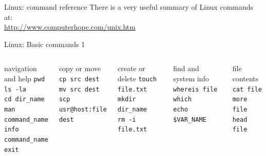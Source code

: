 \documentclass{beamer}
\begin{document}
\begin{frame}{Linux: command reference}
There is a very useful summary of Linux commands at: \\
\url{http://www.computerhope.com/unix.htm}
\end{frame}


\begin{frame}{Linux: Basic commands 1}
  \begin{columns}
    \begin{block}{navigation and help}
      \texttt{pwd} \\
      \texttt{ls -la} \\
      \texttt{cd dir\_name} \\
      \texttt{man command\_name} \\
      \texttt{info command\_name} \\
      \texttt{exit}
    \end{block}
    \begin{block}{copy or move}
      \texttt{cp src dest} \\
      \texttt{mv src dest} \\
      \texttt{scp usr@host:file dest}
    \end{block}

    \begin{block}{create or delete}
      \texttt{touch file.txt} \\ 
      \texttt{mkdir dir\_name} \\ 
      \texttt{rm -i file.txt}
    \end{block}
    \begin{block}{find and system info}
      \texttt{whereis file} \\
      \texttt{which} \\
      \texttt{echo \$VAR\_NAME}
    \end{block}
    \begin{block}{file contents}
      \texttt{cat file} \\
      \texttt{more file} \\
      \texttt{head file}
    \end{block}    
  \end{columns}
\end{frame}
\end{document}
